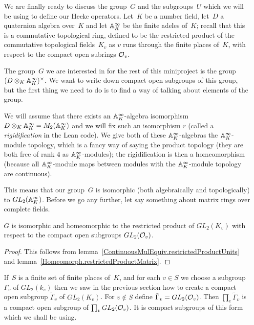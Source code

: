 We are finally ready to discuss the group~$G$ and the subgroups~$U$ which we will be
using to define our Hecke operators. Let~$K$ be a number field, let~$D$ a quaternion algebra
over~$K$ and let $\mathbb{A}_K^\infty$ be the finite adeles of~$K$; recall that this is a commutative
topological ring, defined to be the restricted
product of the commutative topological fields~$K_v$ as $v$ runs through the finite places
of~$K$, with respect to the compact open subrings $\mathcal{O}_v$.

The group~$G$ we are interested in for the rest of this miniproject is the group
$(D\otimes_K\mathbb{A}_K^\infty)^\times$. We want to write down compact open subgroups of this group,
but the first thing we need to do is to find a way of talking about elements of the group.

We will assume that there exists an $\mathbb{A}_K^\infty$-algebra isomorphism
$D\otimes_K\mathbb{A}_K^\infty=M_2(\mathbb{A}_K^\infty)$ and we will fix such an isomorphism $r$
(called a \emph{rigidification} in the Lean code). We give both of these $\mathbb{A}_K^\infty$-algebras
the $\mathbb{A}_K^\infty$-module topology, which is a fancy way of saying the product topology
(they are both free of rank 4 as $\mathbb{A}_K^\infty$-modules); the rigidification is then
a homeomorphism (because all $\mathbb{A}_K^\infty$-module maps between modules with the $\mathbb{A}_K^\infty$-module
topology are continuous).

This means that our group~$G$ is isomorphic (both algebraically and topologically)
to $GL_2(\mathbb{A}_K^\infty)$. Before we go any further,
let say something about matrix rings over complete fields.

\begin{theorem}
  \label{GL2.restrictedProduct}
  \leanok
  $G$ is isomorphic and homeomorphic
  to the restricted product of $GL_2(K_v)$ with respect
  to the compact open subgroups $GL_2(\mathcal{O}_v)$.
\end{theorem}
\begin{proof}
  \leanok
  This follows from lemma~\ref{ContinuousMulEquiv.restrictedProductUnits}
  and lemma~\ref{Homeomorph.restrictedProductMatrix}.
\end{proof}

If~$S$ is a finite set of finite places of~$K$, and for each $v\in S$ we choose
a subgroup $\Gamma_v$ of $GL_2(k_v)$ then we saw in the previous section how to
create a compact open subgroup $\tilde{\Gamma}_v$ of $GL_2(K_v)$. For $v\notin S$
define $\tilde{\Gamma}_v=GL_2(\mathcal{O}_v)$. Then $\prod_v\tilde{\Gamma}_v$ is a compact
open subgroup of $\prod_vGL_2(\mathcal{O}_v)$. It is compact subgroups of this form
which we shall be using.

